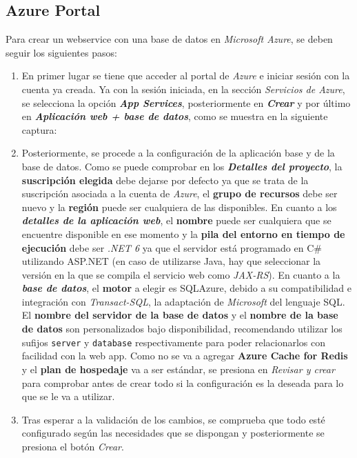 \subsection{Azure Portal}
Para crear un webservice con una base de datos en \textit{Microsoft Azure}, se deben seguir los siguientes pasos:
\begin{enumerate}
    \item En primer lugar se tiene que acceder al portal de \textit{Azure} e
    iniciar sesión con la cuenta ya creada. Ya con la sesión iniciada, en la
    sección \textit{Servicios de Azure}, se selecciona la opción
    \textbf{\textit{App Services}}, posteriormente en \textit{\textbf{Crear}} y
    por último en \textit{\textbf{Aplicación web + base de datos}}, como se
    muestra en la siguiente captura:
    \item Posteriormente, se procede a la configuración de la aplicación base y
    de la base de datos. Como se puede comprobar en los \textbf{\textit{Detalles
    del proyecto}}, la \textbf{suscripción elegida} debe dejarse por defecto ya
    que se trata de la suscripción asociada a la cuenta de \textit{Azure}, el
    \textbf{grupo de recursos} debe ser nuevo y la \textbf{región} puede ser
    cualquiera de las disponibles. En cuanto a los \textbf{\textit{detalles de
    la aplicación web}}, el \textbf{nombre} puede ser cualquiera que se
    encuentre disponible en ese momento y la \textbf{pila del entorno en tiempo
    de ejecución} debe ser \textit{.NET 6} ya que el servidor está programado en
    C\# utilizando ASP.NET (en caso de utilizarse Java, hay que seleccionar la
    versión en la que se compila el servicio web como \textit{JAX-RS}).
     En cuanto a la \textbf{\textit{base de datos}}, el
    \textbf{motor} a elegir es SQLAzure, debido a su compatibilidad e
    integración con \textit{Transact-SQL}, la adaptación de \textit{Microsoft}
    del lenguaje SQL. El \textbf{nombre del servidor de la base de datos} y el
    \textbf{nombre de la base de datos} son personalizados bajo disponibilidad,
    recomendando utilizar los sufijos \texttt{server} y \texttt{database}
    respectivamente para poder relacionarlos con facilidad con la web app. Como
    no se va a agregar \textbf{Azure Cache for Redis} y el \textbf{plan de
    hospedaje} va a ser estándar, se presiona en \textit{Revisar y crear} para
    comprobar antes de crear todo si la configuración es la deseada para lo que
    se le va a utilizar. 
    \item Tras esperar a la validación de los cambios, se comprueba que todo esté configurado según las necesidades que se dispongan y posteriormente se presiona el botón \textit{Crear}.


\end{enumerate}
